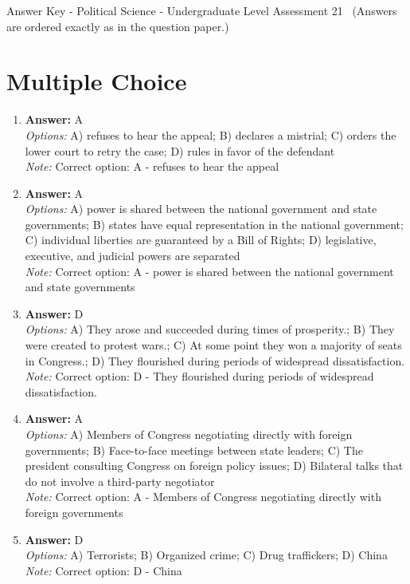 \documentclass[12pt]{article}
\begin{document}
\begin{center}
Answer Key - Political Science - Undergraduate Level Assessment 21 \
\small (Answers are ordered exactly as in the question paper.)
\end{center}

\section*{Multiple Choice}
\begin{enumerate}[label=\arabic*.]
\item \textbf{Answer:} A
\\ \textit{Options:} A) refuses to hear the appeal; B) declares a mistrial; C) orders the lower court to retry the case; D) rules in favor of the defendant
\\ \textit{Note:} Correct option: A - refuses to hear the appeal
\item \textbf{Answer:} A
\\ \textit{Options:} A) power is shared between the national government and state governments; B) states have equal representation in the national government; C) individual liberties are guaranteed by a Bill of Rights; D) legislative, executive, and judicial powers are separated
\\ \textit{Note:} Correct option: A - power is shared between the national government and state governments
\item \textbf{Answer:} D
\\ \textit{Options:} A) They arose and succeeded during times of prosperity.; B) They were created to protest wars.; C) At some point they won a majority of seats in Congress.; D) They flourished during periods of widespread dissatisfaction.
\\ \textit{Note:} Correct option: D - They flourished during periods of widespread dissatisfaction.
\item \textbf{Answer:} A
\\ \textit{Options:} A) Members of Congress negotiating directly with foreign governments; B) Face-to-face meetings between state leaders; C) The president consulting Congress on foreign policy issues; D) Bilateral talks that do not involve a third-party negotiator
\\ \textit{Note:} Correct option: A - Members of Congress negotiating directly with foreign governments
\item \textbf{Answer:} D
\\ \textit{Options:} A) Terrorists; B) Organized crime; C) Drug traffickers; D) China
\\ \textit{Note:} Correct option: D - China
\end{enumerate}
\end{document}
